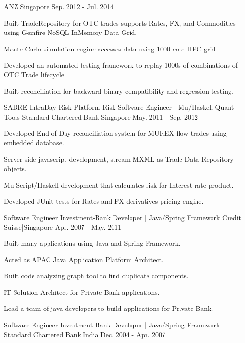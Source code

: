 \begin{cventries}
    {ANZ|Singapore}
    {Sep. 2012 - Jul. 2014}
    {
      \begin{cvitems}
        \item {Built TradeRepository for OTC trades  supports Rates, FX, and Commodities using Gemfire NoSQL InMemory Data Grid.}
        \item {Monte-Carlo simulation engine accesses data using 1000 core HPC grid.}
        \item {Developed an automated testing framework to replay 1000s of combinations of OTC Trade lifecycle.}
        \item {Built reconciliation for backward binary compatibility and regression-testing.}
      \end{cvitems}
    }
  \cventry
    {SABRE IntraDay Risk Platform}
    {Risk Software Engineer | Mu/Haskell Quant Tools}
    {Standard Chartered Bank|Singapore}
    {May. 2011 - Sep. 2012}
    {
      \begin{cvitems}
        \item {Developed End-of-Day reconciliation system for MUREX flow trades using embedded database.}
        \item {Server side javascript development, stream MXML as Trade Data Repository objects.}
        \item {Mu-Script/Haskell development that calculates risk for Interest rate product.}
        \item {Developed JUnit tests for Rates and FX derivatives pricing engine.}
      \end{cvitems}
    }
  \cventry
    {Software Engineer}
    {Investment-Bank Developer | Java/Spring Framework}
    {Credit Suisse|Singapore}
    {Apr. 2007 - May. 2011}
    {
      \begin{cvitems}
        \item {Built many applications using Java and Spring Framework.}
        \item {Acted as APAC Java Application Platform Architect.}
        \item {Built code analyzing graph tool to find duplicate components.}
        \item {IT Solution Architect for Private Bank applications.}
        \item {Lead a team of java developers to build applications for Private Bank.}
      \end{cvitems}
    }
  \cventry
    {Software Engineer}
    {Investment-Bank Developer | Java/Spring Framework}
    {Standard Chartered Bank|India}
    {Dec. 2004 - Apr. 2007}

\end{cventries}
